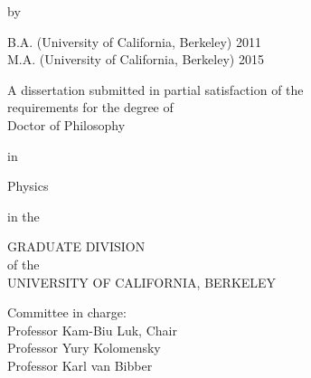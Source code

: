 \begin{center}
  \MyTitle
  
  \vspace{2.5\baselineskip} by %

  \vspace{2.5\baselineskip} \MyAuthor

  \vspace{2\baselineskip}
  B.A. (University of California, Berkeley) 2011\\
  M.A. (University of California, Berkeley) 2015
  \vspace{2\baselineskip}

  A dissertation submitted in partial satisfaction of the\\
  \OnehalfSpacing\frontsize
  requirements for the degree of\\
  Doctor of Philosophy

  \SingleSpacing\frontsize in
  \par\vspace{\baselineskip} Physics
  \par\vspace{\baselineskip} in the
  \par\vspace{\baselineskip}
  GRADUATE DIVISION\\
  \OnehalfSpacing\frontsize
  of the\\
  UNIVERSITY OF CALIFORNIA, BERKELEY

  \vfill\SingleSpacing\frontsize

  Committee in charge:\\
  Professor Kam-Biu Luk, Chair\\
  Professor Yury Kolomensky\\
  Professor Karl van Bibber

  \vspace{2\baselineskip} \MyDate
\end{center}

\clearpage
